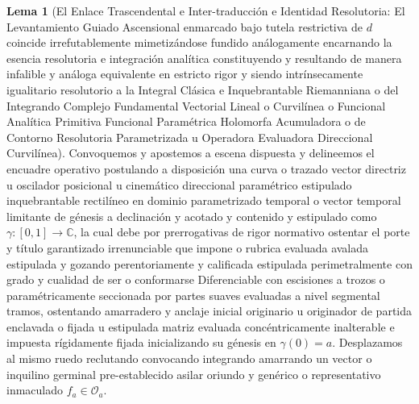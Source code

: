 \documentclass[11pt,a4paper]{article}
\theoremstyle{definition}
\newtheorem{lema}{Lema}[section]
\theoremstyle{remark}
\numberwithin{equation}{section}
\begin{document}
\begin{lema}[El Enlace Trascendental e Inter-traducción e Identidad Resolutoria: El Levantamiento Guiado Ascensional enmarcado bajo tutela restrictiva de $d$ coincide irrefutablemente mimetizándose fundido análogamente encarnando la esencia resolutoria e integración analítica constituyendo y resultando de manera infalible y análoga equivalente en estricto rigor y siendo intrínsecamente igualitario resolutorio a la Integral Clásica e Inquebrantable Riemanniana o del Integrando Complejo Fundamental Vectorial Lineal o Curvilínea o Funcional Analítica Primitiva Funcional Paramétrica Holomorfa Acumuladora o de Contorno Resolutoria Parametrizada u Operadora Evaluadora Direccional Curvilínea]
Convoquemos y apostemos a escena dispuesta y delineemos el encuadre operativo postulando a disposición una curva o trazado vector directriz u oscilador posicional u cinemático direccional paramétrico estipulado inquebrantable rectilíneo en dominio parametrizado temporal o vector temporal limitante de génesis a declinación y acotado y contenido y estipulado como $\gamma: [0, 1] \to \mathbb{C}$, la cual debe por prerrogativas de rigor normativo ostentar el porte y título garantizado irrenunciable que impone o rubrica evaluada avalada estipulada y gozando perentoriamente y calificada estipulada perimetralmente con grado y cualidad de ser o conformarse Diferenciable con escisiones a trozos o paramétricamente seccionada por partes suaves evaluadas a nivel segmental tramos, ostentando amarradero y anclaje inicial originario u originador de partida enclavada o fijada u estipulada matriz evaluada concéntricamente inalterable e impuesta rígidamente fijada inicializando su génesis en $\gamma(0) = a$.
Desplazamos al mismo ruedo reclutando convocando integrando amarrando un vector o inquilino germinal pre-establecido asilar oriundo y genérico o representativo inmaculado $f_a \in \mathcal{O}_a$.

\end{lema}
\end{document}
